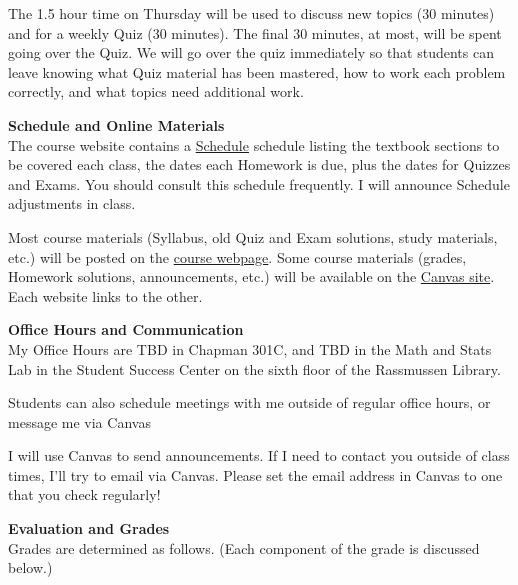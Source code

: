 \documentclass[12pt]{article}
\renewcommand{\emph}[1]{\textsf{\textbf{#1}}}
\newcommand{\localhead}[1]{\par\smallskip\textbf{#1} \smallskip\nobreak\\}%
\def\heading#1{\localhead{\large\emph{#1}}}
\begin{document}
The 1.5 hour time on Thursday will be used to discuss new topics (30
minutes) and for a weekly Quiz (30 minutes).  The final 30 minutes, at
most, will be spent going over the Quiz.  We will go over the quiz
immediately so that students can leave knowing what Quiz material has
been mastered, how to work each problem correctly, and what topics
need additional work.


\clearpage\newpage

\strut

\vspace{-12pt}

\heading{Schedule and Online Materials}
The course website contains a
\href{https://uaf-math251.github.io/calc2/assets/general/S25/meek/schedule.pdf}{Schedule}
schedule
listing the textbook sections to be covered each class, the dates each
Homework is due, plus the dates for Quizzes and Exams. You should
consult this schedule frequently.  I will announce Schedule
adjustments in class.

Most course materials (Syllabus, old Quiz and Exam solutions, study materials, etc.) will be posted on the \href{https://uaf-math251.github.io/calc2/}{course webpage}.  Some course materials (grades, Homework solutions, announcements, etc.) will be available on the \href{https://canvas.alaska.edu/courses/21592}{Canvas site}.  Each website links to the other.


\heading{Office Hours and Communication}
My Office Hours are TBD in Chapman 301C, and
TBD in the Math and Stats Lab in the Student
Success Center on the sixth floor of the Rassmussen Library.

Students can also schedule meetings with me outside of regular office
hours, or message me via Canvas


I will use Canvas to send announcements.  If I need to contact you outside of class times, I'll try to email via Canvas.  Please set the email address in Canvas to one that you check regularly!


\heading{Evaluation and Grades}
Grades are determined as follows.  (Each component of the grade is discussed below.)
 
\end{document}
